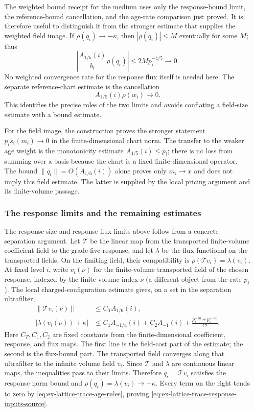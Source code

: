 The weighted bound receipt for the medium uses only the response-bound
limit, the reference-bound cancellation, and the age-rate comparison just
proved. It is therefore useful to distinguish it from the stronger
estimate that supplies the weighted field image. If $\rho(q_i)\to-\kappa$,
then $|\rho(q_i)|\le M$ eventually for some $M$; thus
\[
 \left|\frac{A_{1/5}(i)}{b_i}\rho(q_i)\right|
 \le 2M p_i^{-4/5}\longrightarrow0.
\]
No weighted convergence rate for the response flux itself is needed here.
The separate reference-chart estimate is the cancellation
\[
                         A_{1/5}(i)\rho(w_i)\to0.
\] This identifies the precise roles of the two
limits and avoids conflating a field-size estimate with a bound
estimate.

For the field image, the construction proves the stronger statement
$p_i s_i(m_i)\to0$ in the finite-dimensional chart norm. The transfer to
the weaker age weight is the monotonicity estimate
$A_{1/5}(i)\le p_i$; there is no loss from summing over a basis because the
chart is a fixed finite-dimensional operator. The bound
$\|q_i\|=O(A_{1/6}(i))$ alone proves only $m_i\to x$ and does not imply this
field estimate. The latter is supplied by the local pricing argument and
its finite-volume passage.

\subsubsection{The response limits and the remaining estimates}
\label{subsec:ex-lattice-trace-weighted-route}

The response-size and response-flux limits above follow from a concrete
separation argument. Let $\mathcal T$ be the linear map from the transported
finite-volume coefficient field to the grade-five response, and let
$\lambda$ be the flux functional on the transported fields. On the limiting
field, their compatibility is $\rho(\mathcal T v_i)=\lambda(v_i)$. At fixed
level $i$, write $v_i(\nu)$ for the finite-volume transported field of the
chosen response, indexed by the finite-volume index $\nu$ (a different
object from the rate $p_i$). The local charged-configuration estimate
gives, on a set in the separation ultrafilter,
\begin{align}
 \|\mathcal T v_i(\nu)\|&\le C_TA_{1/6}(i),\\
 |\lambda(v_i(\nu))+\kappa|&\le
 C_1A_{-1/4}(i)+C_2A_{-1}(i)
       +\frac{p_i^{-30}+p_i^{-100}}{12}.
 \label{eq:ex-lattice-trace-finite-response-price}
\end{align}
Here $C_T,C_1,C_2$ are fixed constants from the finite-dimensional
coefficient, response, and flux maps. The first line is the field-cost part
of the estimate; the second is the flux-bound part.
The transported field converges along that ultrafilter to the infinite
volume field $v_i$. Since $\mathcal T$ and $\lambda$ are continuous linear
maps, the inequalities pass to their limits. Therefore
$q_i=\mathcal T v_i$ satisfies the response norm bound and
$\rho(q_i)=\lambda(v_i)\to-\kappa$. Every term on the right tends to zero by
\eqref{eq:ex-lattice-trace-age-rules}, proving
\eqref{eq:ex-lattice-trace-response-inputs-source}.

